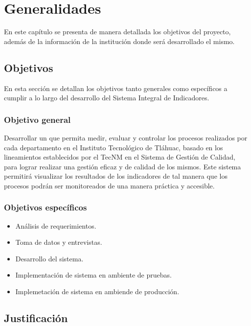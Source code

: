\chapter{Generalidades}
    En este cap\'itulo se presenta de manera detallada los objetivos del proyecto, adem\'as de la informaci\'on de la instituci\'on donde ser\'a desarrollado el mismo.
    
    \section{Objetivos}
    En esta secci\'on se detallan los objetivos tanto generales como espec\'ificos a cumplir a lo largo del desarrollo del Sistema Integral de Indicadores.

\subsection{Objetivo general}

Desarrollar un que permita medir, evaluar y controlar los procesos realizados por cada departamento en el Instituto Tecnol\'ogico de Tl\'ahuac, basado en los lineamientos establecidos por el TecNM en el Sistema de Gesti\'on de Calidad, para lograr realizar una gesti\'on eficaz y de calidad de los mismos.
Este sistema permitir\'a visualizar los resultados de los indicadores de tal manera que los procesos podr\'an ser monitoreados de una manera pr\'actica y accesible.


\subsection{Objetivos espec\'ificos}
\begin{itemize}
    \item An\'alisis de requerimientos.
    \item Toma de datos y entrevistas.
    \item Desarrollo del sistema.
    \item Implementaci\'on de sistema en ambiente de pruebas.
    \item Implemetaci\'on de sistema en ambiende de producci\'on.
\end{itemize}

\section{Justificaci\'on}
\paragraph{}%

